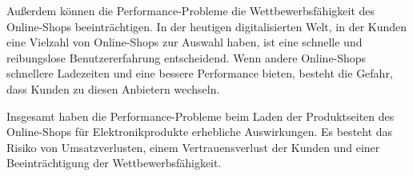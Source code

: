Außerdem können die Performance-Probleme die Wettbewerbsfähigkeit des Online-Shops beeinträchtigen. In der heutigen digitalisierten Welt, in der Kunden eine Vielzahl von Online-Shops zur Auswahl haben, ist eine schnelle und reibungslose Benutzererfahrung entscheidend. Wenn andere Online-Shops schnellere Ladezeiten und eine bessere Performance bieten, besteht die Gefahr, dass Kunden zu diesen Anbietern wechseln.

Insgesamt haben die Performance-Probleme beim Laden der Produktseiten des Online-Shops für Elektronikprodukte erhebliche Auswirkungen. Es besteht das Risiko von Umsatzverlusten, einem Vertrauensverlust der Kunden und einer Beeinträchtigung der Wettbewerbsfähigkeit.